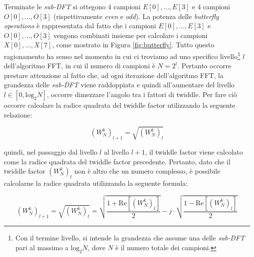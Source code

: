 \documentclass[a4paper,12pt]{report}  %
\begin{document}
Terminate le \textit{sub-DFT} si ottegono $4$ campioni $E[0], \dots, E[3]$ e $4$ campioni $O[0], \dots, O[3]$ (rispettivamente \textit{even} e \textit{odd}).
La potenza delle \textit{butterfly operations} è rappresentata dal fatto che i campioni $E[0], \dots, E[3]$ e $O[0], \dots, O[3]$ vengono combinati insieme per calcolare i campioni $X[0], \dots, X[7]$, come mostrato in Figura \ref{fig:butterfly}.
Tutto questo ragionamento ha senso nel momento in cui ci troviamo ad uno specifico livello\footnote{Con il termine livello, si intende la grandezza che assume una delle \textit{sub-DFT} pari al massimo a $\text{log}_2 N$, dove $N$ è il numero totale dei campioni.} $l$ dell'algoritmo FFT, in cui il numero di campioni è $N = 2^l$.
Pertanto occorre prestare attenzione al fatto che, ad ogni iterazione dell'algoritmo FFT, la grandezza delle \textit{sub-DFT} viene raddoppiata e quindi all'aumentare del livello $l \in [0, \text{log}_2 N]$, occorre dimezzare l'angolo tra i fattori di twiddle.
Per fare ciò occorre calcolare la radice quadrata del twiddle factor utilizzando la seguente relazione:

\begin{equation}
    \left ( W_N^{k} \right )_{l + 1} = \sqrt{\left ( W_N^{k} \right )_l} \nonumber
\end{equation}

quindi, nel passaggio dal livello $l$ al livello $l + 1$, il twiddle factor viene calcolato come la radice quadrata del twiddle factor precedente.
Pertanto, dato che il twiddle factor $\left ( W_N^{k} \right )_l$ non è altro che un numero complesso, è possibile calcolarne la radice quadrata utilizzando la seguente formula:

\begin{equation}
    \label{eq:twiddle_factor}
    \left ( W_N^{k} \right )_{l + 1} = \sqrt{\left ( W_N^{k} \right )_l} = \sqrt{\frac{1 + \text{Re}\left [ \left ( W_N^{k} \right )_l \right ]}{2}} - j \cdot \sqrt{\frac{1 - \text{Re}\left [ \left ( W_N^{k} \right )_l \right ]}{2}}
\end{equation}
\end{document}
